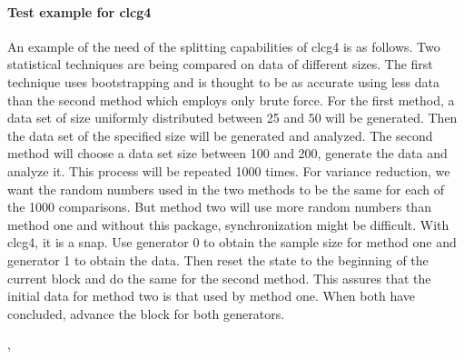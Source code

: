
\paragraph{Test example for clcg4}

An example of  the  need of the splitting capabilities of clcg4 is as  follows. 
Two statistical techniques are being compared on  data of  different sizes. The first 
technique uses   bootstrapping  and is   thought to   be  as accurate using less data   
than the second method   which  employs only brute force.  For the first method, a data
set of size uniformly distributed between 25 and 50 will be generated.  Then the data set  
of the specified size will be generated and analyzed.  The second method will  choose a 
data set size between 100 and 200, generate the data  and analyze it.  This process will 
be repeated 1000 times.  For  variance reduction, we  want the  random numbers  used in the 
two methods to be the  same for each of  the 1000 comparisons.  But method two will  use more
random  numbers than   method one and  without this package, synchronization might be difficult.  
With clcg4, it is a snap.  Use generator 0 to obtain  the sample size for  method one and 
generator 1  to obtain the  data.  Then reset the state to the beginning  of the current  block
and do the same  for the second method.  This assures that the initial data  for method two is 
that used by  method  one.  When both  have concluded,  advance the block for both generators.


\begin{manseealso}
  ,    
\end{manseealso}


